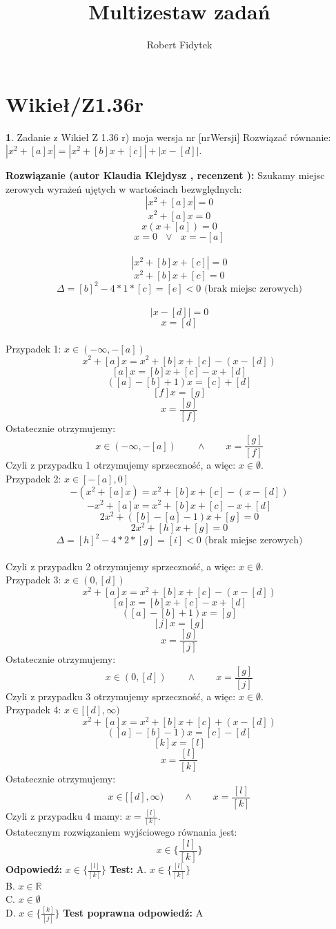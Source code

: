 \documentclass[12pt, a4paper]{article}
\title{Multizestaw zadań}
\author{Robert Fidytek}
\date{}
\theoremstyle{definition} %
\newtheorem{zad}{}
\newcommand{\kategoria}[1]{\section{#1}} %
\newcommand{\zadStart}[1]{\begin{zad}#1\newline} %
\newcommand{\zadStop}{\end{zad}}   %
\newcommand{\rozwStart}[2]{\noindent \textbf{Rozwiązanie (autor #1 , recenzent #2): }\newline} %
\newcommand{\rozwStop}{\newline}                                            %
\newcommand{\odpStart}{\noindent \textbf{Odpowiedź:}\newline}    %
\newcommand{\odpStop}{\newline}                                             %
\newcommand{\testStart}{\noindent \textbf{Test:}\newline} %
\newcommand{\testStop}{\newline} %
\newcommand{\kluczStart}{\noindent \textbf{Test poprawna odpowiedź:}\newline} %
\newcommand{\kluczStop}{\newline} %
\begin{document}
\maketitle


\kategoria{Wikieł/Z1.36r}
\zadStart{Zadanie z Wikieł Z 1.36 r) moja wersja nr [nrWersji]}
Rozwiązać równanie: $|x^2+[a]x|=|x^2+[b]x+[c]|+|x-[d]|$.
\zadStop
\rozwStart{Klaudia Klejdysz}{}
Szukamy miejsc zerowych wyrażeń ujętych w wartościach bezwględnych:
$$|x^2+[a]x|=0$$
$$x^2+[a]x=0$$
$$x(x+[a])=0$$
$$x=0\text{ }\lor\text{ }x=-[a]$$\\
$$|x^2+[b]x+[c]|=0$$
$$x^2+[b]x+[c]=0$$
$$\Delta=[b]^2-4*1*[c]=[e]<0\text{ (brak miejsc zerowych)}$$\\
$$|x-[d]|=0$$
$$x=[d]$$\\
\indent Przypadek 1: $x\in(-\infty,-[a])$
$$x^2+[a]x=x^2+[b]x+[c]-(x-[d])$$
$$[a]x=[b]x+[c]-x+[d]$$
$$([a]-[b]+1)x=[c]+[d]$$
$$[f]x=[g]$$
$$x=\frac{[g]}{[f]}$$
Ostatecznie otrzymujemy:
$$x\in(-\infty,-[a])\qquad\land\qquad x=\frac{[g]}{[f]}$$
Czyli z przypadku 1 otrzymujemy sprzeczność, a więc: $x\in\emptyset$.\\


Przypadek 2: $x\in[-[a],0]$ $$-(x^2+[a]x)=x^2+[b]x+[c]-(x-[d])$$
$$-x^2+[a]x=x^2+[b]x+[c]-x+[d]$$
$$2x^2+([b]-[a]-1)x+[g]=0$$
$$2x^2+[h]x+[g]=0$$
$$\Delta=[h]^2-4*2*[g]=[i]<0\text{ (brak miejsc zerowych)}$$\\
Czyli z przypadku 2 otrzymujemy sprzeczność, a więc: $x\in\emptyset$.\\


Przypadek 3: $x\in(0,[d])$ $$x^2+[a]x=x^2+[b]x+[c]-(x-[d])$$
$$[a]x=[b]x+[c]-x+[d]$$
$$([a]-[b]+1)x=[g]$$
$$[j]x=[g]$$
$$x=\frac{[g]}{[j]}$$
Ostatecznie otrzymujemy:
$$x\in(0,[d])\qquad\land\qquad x=\frac{[g]}{[j]}$$
Czyli z przypadku 3 otrzymujemy sprzeczność, a więc: $x\in\emptyset$.\\


Przypadek 4: $x\in[[d],\infty)$ $$x^2+[a]x=x^2+[b]x+[c]+(x-[d])$$
$$([a]-[b]-1)x=[c]-[d]$$
$$[k]x=[l]$$
$$x=\frac{[l]}{[k]}$$
Ostatecznie otrzymujemy:
$$x\in[[d],\infty)\qquad\land\qquad x=\frac{[l]}{[k]}$$
Czyli z przypadku 4 mamy: $x=\frac{[l]}{[k]}$.\\
Ostatecznym rozwiązaniem wyjściowego równania jest:
$$x\in\bigg\{\frac{[l]}{[k]}\bigg\}$$
\rozwStop
\odpStart
$x\in\bigg\{\frac{[l]}{[k]}\bigg\}$
\odpStop
\testStart
A. $x\in\bigg\{\frac{[l]}{[k]}\bigg\}$\\
B. $x\in\mathbb{R}$\\
C. $x\in\emptyset$\\
D. $x\in\bigg\{\frac{[k]}{[j]}\bigg\}$
\testStop
\kluczStart
A
\kluczStop
\end{document}
